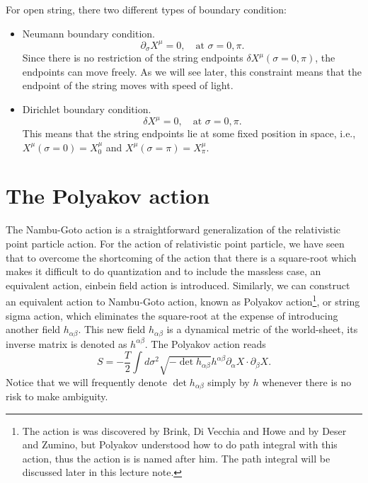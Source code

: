 \documentclass[graybox,envcountchap,sectrefs]{svmono}
\begin{document}
For open string, there two different types of boundary condition: 
\begin{itemize}
\item Neumann boundary condition.
    \begin{equation}
    	  \partial_{\sigma}X^{\mu}=0, \quad \text{at}\,\, \sigma=0,\pi.
    \end{equation}
Since there is no restriction of the string endpoints $\delta X^{\mu}(\sigma=0,\pi)$, the endpoints can move freely. As we will see later, this constraint means that the endpoint of the string moves with speed of light.
 
\item Dirichlet boundary condition. 
 \begin{equation}
 \delta X^{\mu}=0,	\quad \text{at}\,\, \sigma=0,\pi.
 \end{equation}
This means that the string endpoints lie at some fixed position in space, i.e., $X^{\mu}(\sigma=0)=X^{\mu}_0$ and $X^{\mu}(\sigma=\pi)=X^{\mu}_{\pi}$.
\end{itemize}



\section{The Polyakov action}
The Nambu-Goto action is a straightforward generalization of the relativistic point particle action. 
For the action of relativistic point particle, we have seen that to overcome the shortcoming of the action that there is a square-root which makes it difficult to do quantization and to include the massless case, an equivalent action, einbein field action is introduced.
Similarly, we can construct an equivalent action to Nambu-Goto action, known as Polyakov action\footnote{The action is 
was discovered by Brink, Di Vecchia and Howe and by Deser and Zumino, but Polyakov understood how to do path integral with this action, thus the action is is named after him. The path integral will be discussed later in this lecture note.}, or string sigma action, which eliminates the square-root at the expense of introducing another field $h_{\alpha\beta}$. This new field $h_{\alpha\beta}$ is a dynamical metric of the world-sheet, its inverse matrix is denoted as $h^{\alpha\beta}$. The Polyakov action reads
\begin{equation}
\boxed{
S=-\frac{T}{2}	\int d\sigma^2 \sqrt{-\det h_{\alpha\beta}}h^{\alpha\beta}\partial_{\alpha}X\cdot \partial_{\beta}X. }
\end{equation}
Notice that we will frequently denote $\det h_{\alpha\beta}$ simply by $h$ whenever there is no risk to make ambiguity.
\end{document}
